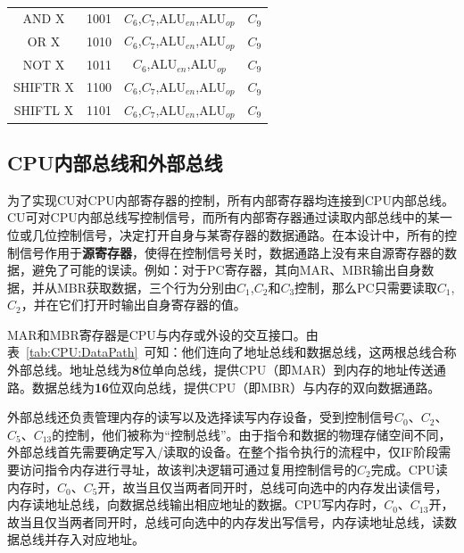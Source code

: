 \documentclass[lang=cn,a4paper,newtx]{elegantpaper}
\begin{document}
\begin{longtable}{cccc}
  
  \midrule
  AND X & 1001 &
  
  $C_6$,$C_7$,$\text{ALU}_{en}$,$\text{ALU}_{op}$ &
  $C_9$ \\

  OR X & 1010 &
  
  $C_6$,$C_7$,$\text{ALU}_{en}$,$\text{ALU}_{op}$ &
  $C_9$ \\

  NOT X & 1011 &
  
  $C_6$,$\text{ALU}_{en}$,$\text{ALU}_{op}$ &
  $C_9$ \\

  SHIFTR X& 1100 &
  $C_6$,$C_7$,$\text{ALU}_{en}$,$\text{ALU}_{op}$ &
  $C_9$ \\

  SHIFTL X& 1101 &
  $C_6$,$C_7$,$\text{ALU}_{en}$,$\text{ALU}_{op}$ &
  $C_9$ \\

\end{longtable}

\subsection{CPU内部总线和外部总线}\label{sec:ExternalControl}
为了实现CU对CPU内部寄存器的控制，所有内部寄存器均连接到CPU内部总线。CU可对CPU内部总线写控制信号，而所有内部寄存器通过读取内部总线中的某一位或几位控制信号，决定打开自身与某寄存器的数据通路。在本设计中，所有的控制信号作用于\textbf{源寄存器}，使得在控制信号关时，数据通路上没有来自源寄存器的数据，避免了可能的误读。例如：对于PC寄存器，其向MAR、MBR输出自身数据，并从MBR获取数据，三个行为分别由$C_1$,$C_2$和$C_3$控制，那么PC只需要读取$C_1$,$C_2$，并在它们打开时输出自身寄存器的值。

MAR和MBR寄存器是CPU与内存或外设的交互接口。由表~\ref{tab:CPU:DataPath}~可知：他们连向了地址总线和数据总线，这两根总线合称外部总线。地址总线为\textbf{8}位单向总线，提供CPU（即MAR）到内存的地址传送通路。数据总线为\textbf{16}位双向总线，提供CPU（即MBR）与内存的双向数据通路。

外部总线还负责管理内存的读写以及选择读写内存设备，受到控制信号$C_0$、$C_2$、$C_5$、$C_{13}$的控制，他们被称为“控制总线”。由于指令和数据的物理存储空间不同，外部总线首先需要确定写入/读取的设备。在整个指令执行的流程中，仅IF阶段需要访问指令内存进行寻址，故该判决逻辑可通过复用控制信号的$C_2$完成。CPU读内存时，$C_0$、$C_5$开，故当且仅当两者同开时，总线可向选中的内存发出读信号，内存读地址总线，向数据总线输出相应地址的数据。CPU写内存时，$C_0$、$C_{13}$开，故当且仅当两者同开时，总线可向选中的内存发出写信号，内存读地址总线，读数据总线并存入对应地址。
\end{document}
